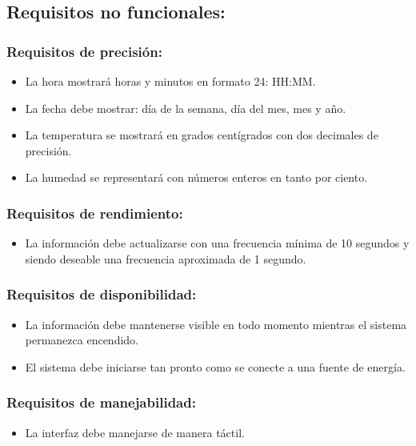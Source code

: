 \subsection{Requisitos no funcionales:}

\subsubsection{Requisitos de precisión:}
\begin{itemize}
    \item La hora mostrará horas y minutos en formato 24: HH:MM.
    \item La fecha debe mostrar: día de la semana, día del mes, mes y año.
    \item La temperatura se mostrará en grados centígrados con dos decimales de precisión.
    \item La humedad se representará con números enteros en tanto por ciento.
\end{itemize}

\subsubsection{Requisitos de rendimiento:}
\begin{itemize}
    \item La información debe actualizarse con una frecuencia mínima de 10 segundos y
    siendo deseable una frecuencia aproximada de 1 segundo.
\end{itemize}

\subsubsection{Requisitos de disponibilidad:}
\begin{itemize}
    \item La información debe mantenerse visible en todo momento mientras el sistema
    permanezca encendido.
    \item El sistema debe iniciarse tan pronto como se conecte a una fuente de energía.
\end{itemize}

\subsubsection{Requisitos de manejabilidad:}
\begin{itemize}
    \item La interfaz debe manejarse de manera táctil.
\end{itemize}

